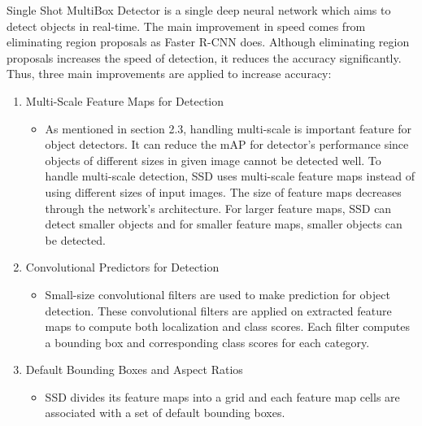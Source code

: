 \documentclass{article}
\begin{document}
\setlength{\parindent}{6ex}

\indent

Single Shot MultiBox Detector is a single deep neural network which aims to detect 
objects in real-time. The main improvement in speed comes from eliminating region 
proposals as Faster R-CNN does. Although eliminating region proposals increases 
the speed of detection, it reduces the accuracy significantly. Thus, three main 
improvements are applied to increase accuracy:
\begin{enumerate}
    \item Multi-Scale Feature Maps for Detection
    \begin{itemize}
        \item As mentioned in section 2.3, handling multi-scale is important feature 
for object detectors. It can reduce the mAP for detector's performance since objects 
of different sizes in given image cannot be detected well. To handle multi-scale detection, 
SSD uses multi-scale feature maps instead of using different sizes of input images. 
The size of feature maps decreases through the network's architecture. For larger feature maps,
SSD can detect smaller objects and for smaller feature maps, smaller objects can be detected.
    \end{itemize}
    \item Convolutional Predictors for Detection
    \begin{itemize}
        \item Small-size convolutional filters are used to make prediction for 
object detection. These convolutional filters are applied on extracted feature maps 
to compute both localization and class scores. Each filter computes a bounding box and 
corresponding class scores for each category.
    \end{itemize}
    \item Default Bounding Boxes and Aspect Ratios
    \begin{itemize}
        \item SSD divides its feature maps into a grid and each feature map cells are 
associated with a set of default bounding boxes. 
    \end{itemize}
\end{enumerate}
\end{document}
